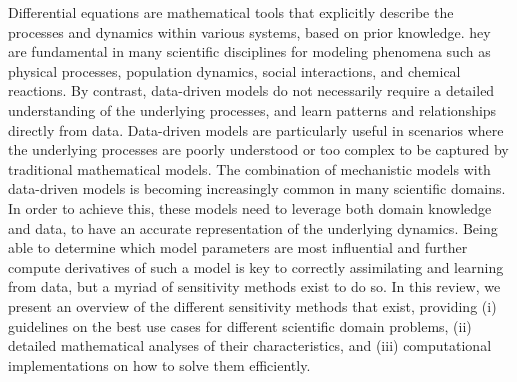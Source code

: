 Differential equations are mathematical tools that explicitly describe the processes and dynamics within various systems, based on prior knowledge. 
hey are fundamental in many scientific disciplines for modeling phenomena such as physical processes, population dynamics, social interactions, and chemical reactions.
By contrast, data-driven models do not necessarily require a detailed understanding of the underlying processes, and learn patterns and relationships directly from data. 
Data-driven models are particularly useful in scenarios where the underlying processes are poorly understood or too complex to be captured by traditional mathematical models.
The combination of mechanistic models with data-driven models is becoming increasingly common in many scientific domains. 
In order to achieve this, these models need to leverage both domain knowledge and data, to have an accurate representation of the underlying dynamics. 
Being able to determine which model parameters are most influential and further compute derivatives of such a model is key to correctly assimilating and learning from data, but a myriad of sensitivity methods exist to do so. 
In this review, we present an overview of the different sensitivity methods that exist, providing (i) guidelines on the best use cases for different scientific domain problems, (ii) detailed mathematical analyses of their characteristics, and (iii) computational implementations on how to solve them efficiently. 
